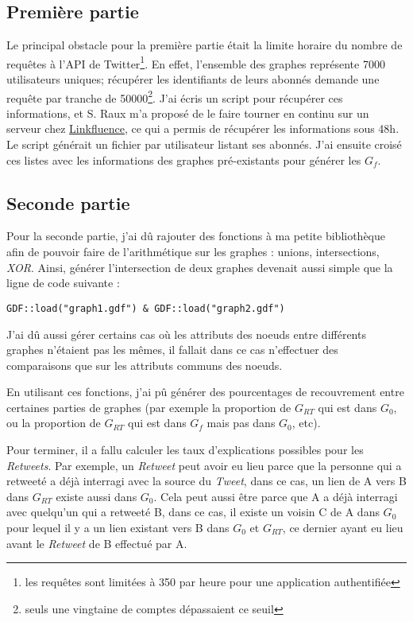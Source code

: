 \documentclass[]{article}
\begin{document}
\subsection{Première partie}

Le principal obstacle pour la première partie était la limite horaire du
nombre de requêtes à l'API de Twitter\footnote{les requêtes sont
  limitées à 350 par heure pour une application authentifiée}. En effet,
l'ensemble des graphes représente 7000 utilisateurs uniques; récupérer
les identifiants de leurs abonnés demande une requête par tranche de
50000\footnote{seuls une vingtaine de comptes dépassaient ce seuil}.
J'ai écris un script pour récupérer ces informations, et S. Raux m'a
proposé de le faire tourner en continu sur un serveur chez
\href{http://fr.linkfluence.net/}{Linkfluence}, ce qui a permis de
récupérer les informations sous 48h. Le script générait un fichier par
utilisateur listant ses abonnés. J'ai ensuite croisé ces listes avec les
informations des graphes pré-existants pour générer les $G_{f}$.

\subsection{Seconde partie}

Pour la seconde partie, j'ai dû rajouter des fonctions à ma petite
bibliothèque afin de pouvoir faire de l'arithmétique sur les graphes :
unions, intersections, \emph{XOR}. Ainsi, générer l'intersection de deux
graphes devenait aussi simple que la ligne de code suivante :

\begin{verbatim}
GDF::load("graph1.gdf") & GDF::load("graph2.gdf")
\end{verbatim}
J'ai dû aussi gérer certains cas où les attributs des noeuds entre
différents graphes n'étaient pas les mêmes, il fallait dans ce cas
n'effectuer des comparaisons que sur les attributs communs des noeuds.

En utilisant ces fonctions, j'ai pû générer des pourcentages de
recouvrement entre certaines parties de graphes (par exemple la
proportion de $G_{RT}$ qui est dans $G_{0}$, ou la proportion de $G_{RT}$ qui est
dans $G_{f}$ mais pas dans $G_{0}$, etc).

Pour terminer, il a fallu calculer les taux d'explications possibles
pour les \emph{Retweets}. Par exemple, un \emph{Retweet} peut avoir eu
lieu parce que la personne qui a retweeté a déjà interragi avec la
source du \emph{Tweet}, dans ce cas, un lien de A vers B dans $G_{RT}$
existe aussi dans $G_{0}$. Cela peut aussi être parce que A a déjà
interragi avec quelqu'un qui a retweeté B, dans ce cas, il existe un
voisin C de A dans $G_{0}$ pour lequel il y a un lien existant vers B dans
$G_{0}$ et $G_{RT}$, ce dernier ayant eu lieu avant le \emph{Retweet} de B
effectué par A.
\end{document}
